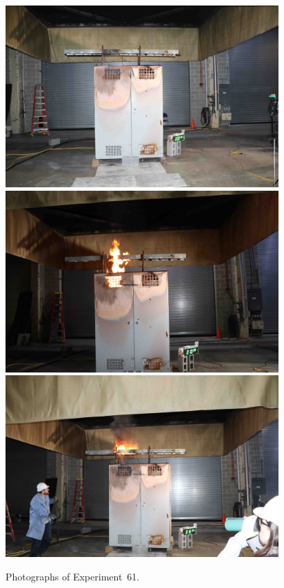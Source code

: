 \documentclass[12pt]{article}
\begin{document}
\begin{figure}[p]
\centering
\includegraphics[height=2.75in]{../FIGURES/Test_61_setup} \\
\includegraphics[height=2.75in]{../FIGURES/Test_61_10_min_28_s} \\
\includegraphics[height=2.75in]{../FIGURES/Test_61_15_min_34_s}
\caption[Photographs of Experiment~61]{Photographs of Experiment~61.}
\label{fig:Test_61_photos}
\end{figure}


\clearpage
\end{document}
